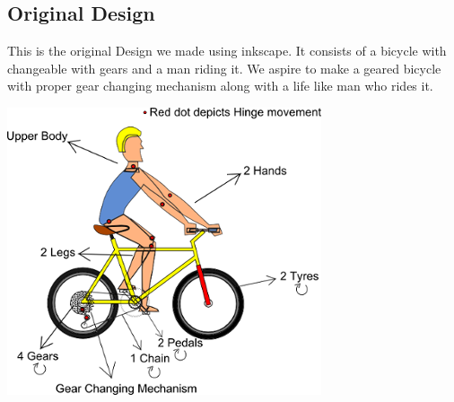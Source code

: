 \documentclass[11pt]{article}
\begin{document}
\subsection{Original Design}
This is the original Design we made using inkscape. It consists of a bicycle with changeable with gears and a man riding it.
We aspire to make a geared bicycle with proper gear changing mechanism along with a life like man who rides it. 
	\begin{center}
		\includegraphics{projectsketch}
	\end{center}
\end{document}
